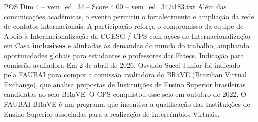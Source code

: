 \begin{textsample}{POS Dim 4 – vem\_ed\_34 – Score 4.00 – vem\_ed\_34/t183.txt}
Além das comunicações acadêmicas, o evento permitiu o fortalecimento e ampliação da rede de contatos internacionais.
A participação reforça o compromisso da equipe de Apoio à Internacionalização da CGESG / CPS com ações de Internacionalização em Casa \textbf{inclusivas} e alinhadas às demandas do mundo do trabalho, ampliando oportunidades globais para estudantes e professores das Fatecs.
Indicação para comissão avaliadora Em 2 de abril de 2026, Osvaldo Succi Junior foi indicado pela FAUBAI para compor a comissão avaliadora do BRaVE (Brazilian Virtual Exchange), que analisa propostas de Instituições de Ensino Superior brasileiras candidatas ao selo BRaVE.
O CPS conquistou esse selo em outubro de 2022.
O FAUBAI-BRaVE é um programa que incentiva a qualificação das Instituições de Ensino Superior associadas para a realização de Intercâmbios Virtuais.

\end{textsample}
